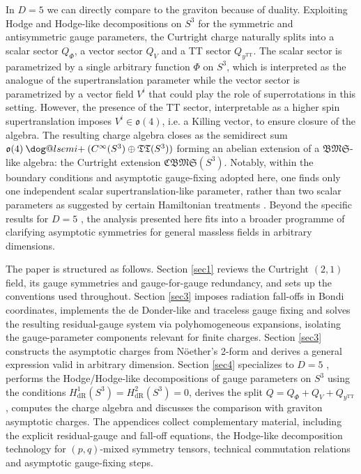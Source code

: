 \documentclass[a4paper,12pt]{article}
\makeatletter
\DeclareRobustCommand{\loplus}{\mathbin{\mathpalette\dog@lsemi{+}}}
\newcommand{\dog@lsemi}[2]{\dog@semi{#1}{#2}{270,90}}
\newcommand{\dog@semi}[3]{%
  \begingroup
  \sbox\z@{$\m@th#1#2$}%
  \setlength{\unitlength}{\dimexpr\ht\z@+\dp\z@\relax}%
  \makebox[\wd\z@]{\raisebox{-\dp\z@}{%
    \begin{picture}(1,1)
    \linethickness{\variable@rule{#1}}
    \roundcap
    \put(0.5,0.5){\makebox(0,0){\raisebox{\dp\z@}{$\m@th#1#2$}}}
    \put(0.5,0.5){\arc[#3]{0.5}}
    \end{picture}%
  }}%
  \endgroup
}
\newcommand{\variable@rule}[1]{%
  \fontdimen8  
  \ifx#1\displaystyle\textfont3\else
    \ifx#1\textstyle\textfont3\else
      \ifx#1\scriptstyle\scriptfont3\else
        \scriptscriptfont3\relax
  \fi\fi\fi
}
\makeatother
\begin{document}
In \( D = 5 \) we can directly compare to the graviton because of duality. Exploiting Hodge and Hodge-like decompositions on \( S^{3} \) for the symmetric and antisymmetric gauge parameters, the Curtright charge naturally splits into a scalar sector \( Q_{\Phi} \), a vector sector \( Q_{V} \) and a TT sector \( Q_{y^{\text{TT}}} \). The scalar sector is parametrized by a single arbitrary function \( \Phi \) on \( S^{3} \), which is interpreted as the analogue of the supertranslation parameter while the vector sector is parametrized by a vector field \( V^{i} \) that could play the role of superrotations in this setting. However, the presence of the TT sector, interpretable as a higher spin supertranslation imposes $V^i \in \mathfrak{o}(4)$, i.e. a Killing vector, to ensure closure of the algebra. The resulting charge algebra closes as the semidirect sum \( \mathfrak{o}(4) \loplus (C^{\infty}(S^3) \oplus \mathfrak{TT}(S^3)) \) forming an abelian extension of a $\mathfrak{BMS}$-like algebra: the Curtright extension $\mathfrak{CBMS}(S^3)$. Notably, within the boundary conditions and asymptotic gauge-fixing adopted here, one finds only one independent scalar supertranslation-like parameter, rather than two scalar parameters as suggested by certain Hamiltonian treatments \cite{Fuentealba:2022HamiltonianBMS5}. Beyond the specific results for \( D = 5 \) , the analysis presented here fits into a broader programme of clarifying asymptotic symmetries for general massless fields in arbitrary dimensions. 

The paper is structured as follows. Section \ref{sec1}  reviews the Curtright \( (2,1) \) field, its gauge symmetries and gauge-for-gauge redundancy, and sets up the conventions used throughout. Section \ref{sec3} imposes radiation fall-offs in Bondi coordinates, implements the de Donder-like and traceless gauge fixing and solves the resulting residual-gauge system via polyhomogeneous expansions, isolating the gauge-parameter components relevant for finite charges. Section \ref{sec3} constructs the asymptotic charges from N\"oether's 2-form and derives a general expression valid in arbitrary dimension. Section \ref{sec4} specializes to \( D = 5 \) , performs the Hodge/Hodge-like decompositions of gauge parameters on \( S^{3} \) using the conditions $H^1_{\text{dR}}(S^3)=H^2_{\text{dR}}(S^3)=0$, derives the split \( Q = Q_{\Phi} + Q_{V} + Q_{y^{\text{TT}}}\), computes the charge algebra and discusses the comparison with graviton asymptotic charges. The appendices collect complementary material, including the explicit residual-gauge and fall-off equations, the Hodge-like decomposition technology for $(p,q)$-mixed symmetry tensors, technical commutation relations and asymptotic gauge-fixing steps.
\end{document}
